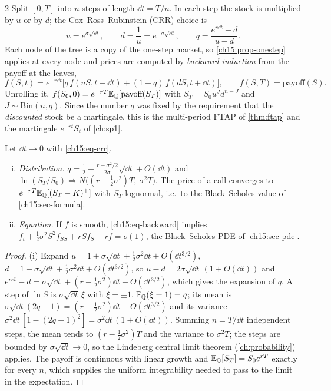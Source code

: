 \begin{paracol}{2}
Split $[0,T]$ into $n$ steps of length $\dd t=T/n$. In each step the stock is multiplied by $u$ or by $d$; the
Cox--Ross--Rubinstein (CRR) choice is
\begin{equation}\label{ch15:eq-crr}
  u=e^{\sigma\sqrt{\dd t}},\qquad d=\frac1u=e^{-\sigma\sqrt{\dd t}},\qquad
  q=\frac{e^{r\dd t}-d}{u-d}.
\end{equation}
Each node of the tree is a copy of the one-step market, so \cref{ch15:prop-onestep} applies at every node and prices are computed by
\emph{backward induction} from the payoff at the leaves,
\begin{equation}\label{ch15:eq-backward}
  f(S,t)=e^{-r\dd t}\bigl[q\,f(uS,t+\dd t)+(1-q)\,f(dS,t+\dd t)\bigr],
  \qquad f(S,T)=\text{payoff}(S).
\end{equation}
Unrolling it, $f(S_0,0)=e^{-rT}\mathbb{E}_{\mathbb{Q}}[\text{payoff}(S_T)]$ with $S_T=S_0u^{J}d^{n-J}$ and $J\sim\mathrm{Bin}(n,q)$. Since
the number $q$ was fixed by the requirement that the \emph{discounted} stock be a martingale, this is the multi-period FTAP of \cref{thm:ftap}
and the martingale $e^{-rt}S_t$ of \cref{ch:sp1}.

\begin{proposition}\label{ch15:prop-limit}
Let $\dd t\to0$ with \eqref{ch15:eq-crr}.
\begin{enumerate}[(i)]
  \item \emph{Distribution.} $q=\frac12+\frac{r-\sigma^2/2}{2\sigma}\sqrt{\dd t}+O(\dd t)$ and
        $\ln(S_T/S_0)\Rightarrow N\bigl((r-\tfrac12\sigma^2)T,\ \sigma^2T\bigr)$. The price of a call
        converges to $e^{-rT}\mathbb{E}_{\mathbb{Q}}[(S_T-K)^+]$ with $S_T$ lognormal, i.e.\ to the Black--Scholes value of \cref{ch15:sec-formula}.
  \item \emph{Equation.} If $f$ is smooth, \eqref{ch15:eq-backward} implies
        $f_t+\tfrac12\sigma^2S^2f_{SS}+rSf_S-rf=o(1)$, the Black--Scholes PDE of \cref{ch15:sec-pde}.
\end{enumerate}
\end{proposition}
\begin{proof}
(i) Expand $u=1+\sigma\sqrt{\dd t}+\tfrac12\sigma^2\dd t+O(\dd t^{3/2})$, $d=1-\sigma\sqrt{\dd t}+\tfrac12\sigma^2\dd t+O(\dd t^{3/2})$, so
$u-d=2\sigma\sqrt{\dd t}\,(1+O(\dd t))$ and $e^{r\dd t}-d=\sigma\sqrt{\dd t}+(r-\tfrac12\sigma^2)\dd t+O(\dd t^{3/2})$, which gives the
expansion of $q$. A step of $\ln S$ is $\sigma\sqrt{\dd t}\,\xi$ with $\xi=\pm1$, $\mathbb{P}_{\mathbb{Q}}(\xi=1)=q$; its mean is
$\sigma\sqrt{\dd t}(2q-1)=(r-\tfrac12\sigma^2)\dd t+O(\dd t^{3/2})$ and its variance $\sigma^2\dd t\,[1-(2q-1)^2]=\sigma^2\dd t\,(1+O(\dd t))$.
Summing $n=T/\dd t$ independent steps, the mean tends to $(r-\tfrac12\sigma^2)T$ and the variance to $\sigma^2T$; the steps are bounded by $\sigma\sqrt{\dd t}\to0$,
so the Lindeberg central limit theorem (\cref{ch:probability}) applies. The payoff is continuous with linear growth and
$\mathbb{E}_{\mathbb{Q}}[S_T]=S_0e^{rT}$ exactly for every $n$, which supplies the uniform integrability needed to pass to the limit in the expectation.


\end{proof}
\end{paracol}
